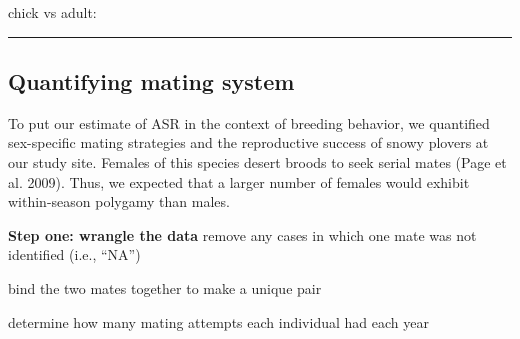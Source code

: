 \documentclass[]{article}
\newenvironment{Shaded}{\begin{snugshade}}{\end{snugshade}}
\newcommand{\KeywordTok}[1]{\textcolor[rgb]{0.13,0.29,0.53}{\textbf{{#1}}}}
\newcommand{\DataTypeTok}[1]{\textcolor[rgb]{0.13,0.29,0.53}{{#1}}}
\newcommand{\DecValTok}[1]{\textcolor[rgb]{0.00,0.00,0.81}{{#1}}}
\newcommand{\StringTok}[1]{\textcolor[rgb]{0.31,0.60,0.02}{{#1}}}
\newcommand{\CommentTok}[1]{\textcolor[rgb]{0.56,0.35,0.01}{\textit{{#1}}}}
\newcommand{\NormalTok}[1]{{#1}}
\begin{document}
chick vs adult:

\begin{Shaded}
\end{Shaded}

\begin{center}\rule{0.5\linewidth}{\linethickness}\end{center}

\subsection{Quantifying mating system}\label{quantifying-mating-system}

To put our estimate of ASR in the context of breeding behavior, we
quantified sex-specific mating strategies and the reproductive success
of snowy plovers at our study site. Females of this species desert
broods to seek serial mates (Page et al. 2009). Thus, we expected that a
larger number of females would exhibit within-season polygamy than
males.

\textbf{Step one: wrangle the data} remove any cases in which one mate
was not identified (i.e., ``NA'')

\begin{Shaded}
\end{Shaded}

bind the two mates together to make a unique pair

\begin{Shaded}
\end{Shaded}

determine how many mating attempts each individual had each year
\end{document}

